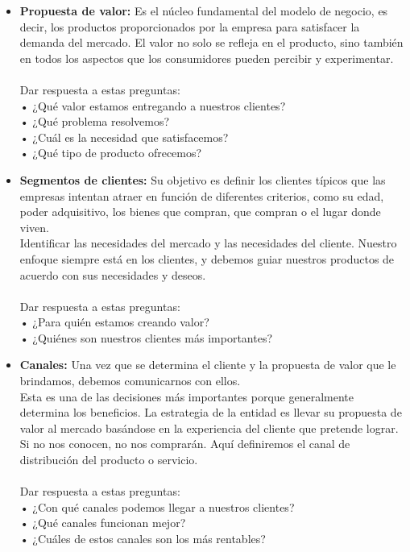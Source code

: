 \documentclass[preprint,12pt]{elsarticle}
\begin{document}
	\begin{itemize}
	\item {\textbf{Propuesta de valor: }} Es el núcleo fundamental del modelo de negocio, es decir, los productos proporcionados por la empresa para satisfacer la demanda del mercado. El valor no solo se refleja en el producto, sino también en todos los aspectos que los consumidores pueden percibir y experimentar.\cite{referenciasosa2}  \\\\Dar respuesta a estas preguntas:\\ • ¿Qué valor estamos entregando a nuestros clientes?\\ • ¿Qué problema resolvemos?\\ • ¿Cuál es la necesidad que satisfacemos? \\ • ¿Qué tipo de producto ofrecemos? 

	\item {\textbf{Segmentos de clientes: }} Su objetivo es definir los clientes típicos que las empresas intentan atraer en función de diferentes criterios, como su edad, poder adquisitivo, los bienes que compran, que compran o el lugar donde viven. \\Identificar las necesidades del mercado y las necesidades del cliente. Nuestro enfoque siempre está en los clientes, y debemos guiar nuestros productos de acuerdo con sus necesidades y deseos.\\\\Dar respuesta a estas preguntas:\\ • ¿Para quién estamos creando valor?\\ • ¿Quiénes son nuestros clientes más importantes?

	\item {\textbf{Canales: }} Una vez que se determina el cliente y la propuesta de valor que le brindamos, debemos comunicarnos con ellos. \\ Esta es una de las decisiones más importantes porque generalmente determina los beneficios. La estrategia de la entidad es llevar su propuesta de valor al mercado basándose en la experiencia del cliente que pretende lograr.\cite{referenciasosa3}  Si no nos conocen, no nos comprarán. Aquí definiremos el canal de distribución del producto o servicio.\\\\Dar respuesta a estas preguntas:\\ • ¿Con qué canales podemos llegar a nuestros clientes? \\ • ¿Qué canales funcionan mejor? \\ • ¿Cuáles de estos canales son los más rentables?


\end{itemize}
\end{document}
